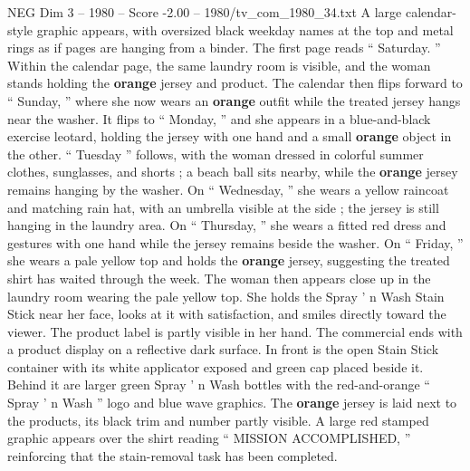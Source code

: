 \begin{textsample}{NEG Dim 3 – 1980 – Score -2.00 – 1980/tv\_com\_1980\_34.txt}
A large calendar-style graphic appears, with oversized black weekday names at the top and metal rings as if pages are hanging from a binder.
The first page reads “ Saturday. ” Within the calendar page, the same laundry room is visible, and the woman stands holding the \textbf{orange} jersey and product.
The calendar then flips forward to “ Sunday, ” where she now wears an \textbf{orange} outfit while the treated jersey hangs near the washer.
It flips to “ Monday, ” and she appears in a blue-and-black exercise leotard, holding the jersey with one hand and a small \textbf{orange} object in the other. “ Tuesday ” follows, with the woman dressed in colorful summer clothes, sunglasses, and shorts ; a beach ball sits nearby, while the \textbf{orange} jersey remains hanging by the washer.
On “ Wednesday, ” she wears a yellow raincoat and matching rain hat, with an umbrella visible at the side ; the jersey is still hanging in the laundry area.
On “ Thursday, ” she wears a fitted red dress and gestures with one hand while the jersey remains beside the washer.
On “ Friday, ” she wears a pale yellow top and holds the \textbf{orange} jersey, suggesting the treated shirt has waited through the week.
The woman then appears close up in the laundry room wearing the pale yellow top.
She holds the Spray ’ n Wash Stain Stick near her face, looks at it with satisfaction, and smiles directly toward the viewer.
The product label is partly visible in her hand.
The commercial ends with a product display on a reflective dark surface.
In front is the open Stain Stick container with its white applicator exposed and green cap placed beside it.
Behind it are larger green Spray ’ n Wash bottles with the red-and-orange “ Spray ’ n Wash ” logo and blue wave graphics.
The \textbf{orange} jersey is laid next to the products, its black trim and number partly visible.
A large red stamped graphic appears over the shirt reading “ MISSION ACCOMPLISHED, ” reinforcing that the stain-removal task has been completed.

\end{textsample}
